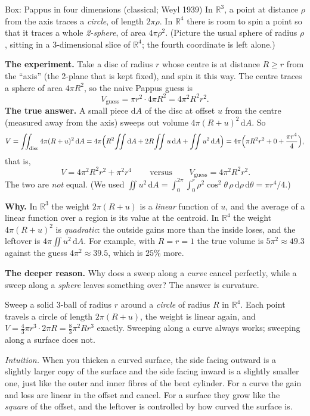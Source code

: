 \documentclass[11pt]{article}
\theoremstyle{plain}
\theoremstyle{definition}
\theoremstyle{remark}
\newcommand{\R}{\mathbb{R}}
\newcommand{\dd}{\,\mathrm{d}}
\begin{document}
\begin{sidebox}{Box: Pappus in four dimensions (classical; Weyl 1939)}
In $\R^3$, a point at distance $\rho$ from the axis traces a \emph{circle}, of length $2\pi\rho$. In $\R^4$ there is room to spin a point so that it traces a whole \emph{2-sphere}, of area $4\pi\rho^2$. (Picture the usual sphere of radius $\rho$, sitting in a 3-dimensional slice of $\R^4$; the fourth coordinate is left alone.)

\medskip
\textbf{The experiment.} Take a disc of radius $r$ whose centre is at distance $R\ge r$ from the ``axis'' (the 2-plane that is kept fixed), and spin it this way. The centre traces a sphere of area $4\pi R^2$, so the naive Pappus guess is
\[
  V_{\text{guess}} = \pi r^2\cdot 4\pi R^2 = 4\pi^2R^2r^2 .
\]
\textbf{The true answer.} A small piece $\mathrm dA$ of the disc at offset $u$ from the centre (measured away from the axis) sweeps out volume $4\pi(R+u)^2\dd A$. So
\[
  V=\iint_{\text{disc}}4\pi(R+u)^2\dd A
   =4\pi\Bigl(R^2\!\iint \mathrm dA+2R\!\iint u\dd A+\iint u^2\dd A\Bigr)
   =4\pi\Bigl(\pi R^2r^2+0+\frac{\pi r^4}{4}\Bigr),
\]
that is,
\[
  \boxed{\,V=4\pi^2R^2r^2+\pi^2r^4\,}\qquad\text{versus}\qquad V_{\text{guess}}=4\pi^2R^2r^2 .
\]
The two are \emph{not} equal. (We used $\iint u^2\dd A=\int_0^{2\pi}\!\!\int_0^r \rho^2\cos^2\!\theta\,\rho\dd\rho\dd\theta=\pi r^4/4$.)

\medskip
\textbf{Why.} In $\R^3$ the weight $2\pi(R+u)$ is a \emph{linear} function of $u$, and the average of a linear function over a region is its value at the centroid. In $\R^4$ the weight $4\pi(R+u)^2$ is \emph{quadratic}: the outside gains more than the inside loses, and the leftover is $4\pi\iint u^2\dd A$. For example, with $R=r=1$ the true volume is $5\pi^2\approx 49.3$ against the guess $4\pi^2\approx 39.5$, which is $25\%$ more.

\medskip
\textbf{The deeper reason.} Why does a sweep along a \emph{curve} cancel perfectly, while a sweep along a \emph{sphere} leaves something over? The answer is curvature.

\emph{} Sweep a solid 3-ball of radius $r$ around a \emph{circle} of radius $R$ in $\R^4$. Each point travels a circle of length $2\pi(R+u)$, the weight is linear again, and $V=\tfrac43\pi r^3\cdot2\pi R=\tfrac83\pi^2Rr^3$ exactly. Sweeping along a curve always works; sweeping along a surface does not.

\emph{Intuition.} When you thicken a curved surface, the side facing outward is a slightly larger copy of the surface and the side facing inward is a slightly smaller one, just like the outer and inner fibres of the bent cylinder. For a curve the gain and loss are linear in the offset and cancel. For a surface they grow like the \emph{square} of the offset, and the leftover is controlled by how curved the surface is.


\end{sidebox}
\end{document}
